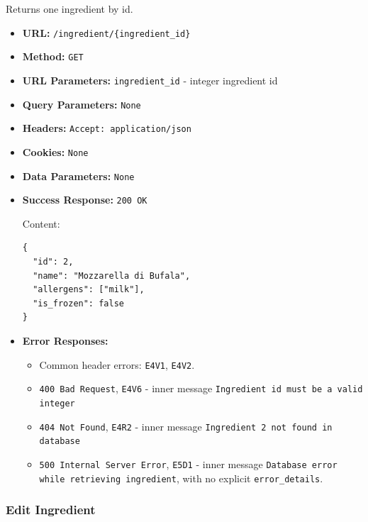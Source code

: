 Returns one ingredient by id.

\begin{itemize}[nosep]
\item \textbf{URL:} \texttt{/ingredient/\{ingredient\_id\}}

\item \textbf{Method:} \texttt{GET}

\item \textbf{URL Parameters:} \texttt{ingredient\_id} - integer ingredient id

\item \textbf{Query Parameters:} \texttt{None}

\item \textbf{Headers:} \texttt{Accept: application/json}

\item \textbf{Cookies:} \texttt{None}

\item \textbf{Data Parameters:} \texttt{None}

\item \textbf{Success Response:} \texttt{200 OK}

Content:

\begin{lstlisting}
{
  "id": 2,
  "name": "Mozzarella di Bufala",
  "allergens": ["milk"],
  "is_frozen": false
}
\end{lstlisting}

\item \textbf{Error Responses:}

\begin{itemize}[nosep]
\item Common header errors: \texttt{E4V1}, \texttt{E4V2}.
\item \texttt{400 Bad Request}, \texttt{E4V6} - inner message \texttt{Ingredient id must be a valid integer}
\item \texttt{404 Not Found}, \texttt{E4R2} - inner message \texttt{Ingredient 2 not found in database}
\item \texttt{500 Internal Server Error}, \texttt{E5D1} - inner message \texttt{Database error while retrieving ingredient}, with no explicit \texttt{error\_details}.
\end{itemize}

\end{itemize}

\subsubsection*{Edit Ingredient}

